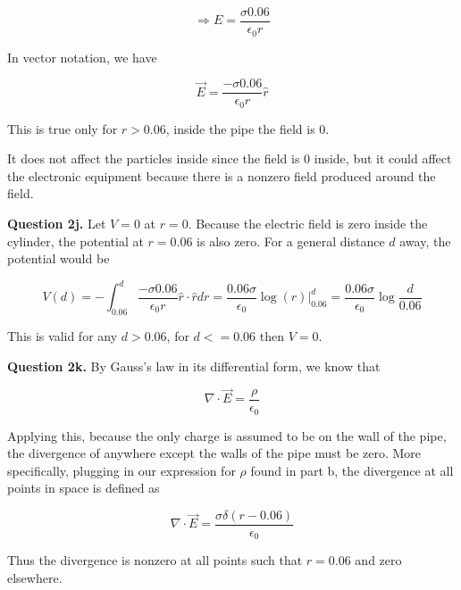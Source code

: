 \documentclass[letterpaper, reqno,11pt]{article}
\begin{document}
$$
    \Rightarrow E=\frac{\sigma 0.06}{\epsilon_0 r}
$$

In vector notation, we have 

$$
    \vec E=\frac{-\sigma 0.06}{\epsilon_0 r} \hat r
$$

This is true only for $r>0.06$, inside the pipe the field is 0. 

 It does not affect the particles inside since the field is 0 inside, but it could affect the electronic equipment because there is a nonzero field produced around the field. 

{\noindent\bf Question 2j.} Let $V=0$ at $r=0$. Because the electric field is zero inside the cylinder, the potential at $r=0.06$ is also zero. For a general distance $d$ away, the potential would be 

$$
    V(d)=-\int_{0.06}^d\frac{-\sigma 0.06}{\epsilon_0 r}\hat r \cdot \hat r dr=\frac{0.06\sigma}{\epsilon_0}\log(r)\bigg|_{0.06}^d=\frac{0.06\sigma}{\epsilon_0}\log\frac{d}{0.06}
$$

This is valid for any $d>0.06$, for $d<=0.06$ then $V=0$. 

{\noindent\bf Question 2k.} By Gauss's law in its differential form, we know that 

$$
    \nabla \cdot \vec E=\frac{\rho}{\epsilon_0}
$$

Applying this, because the only charge is assumed to be on the wall of the pipe, the divergence of anywhere except the walls of the pipe must be zero. More specifically, plugging in our expression for $\rho$ found in part b, the divergence at all points in space is defined as 

$$
    \nabla\cdot\vec E=\frac{\sigma\delta(r-0.06)}{\epsilon_0}
$$

Thus the divergence is nonzero at all points such that $r=0.06$ and zero elsewhere. 
\end{document}
